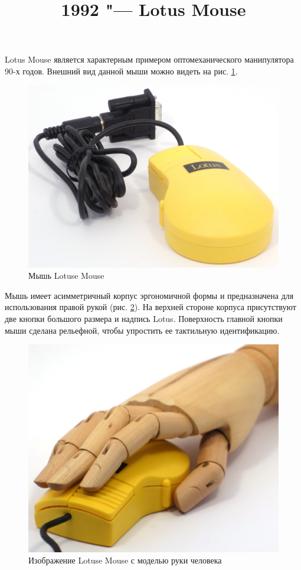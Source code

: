 \documentclass[11pt, a4paper]{article}
\begin{document}
\title{1992 "--- Lotus Mouse}
\date{}
\maketitle

Lotus Mouse является характерным примером оптомеханического манипулятора 90-х годов. Внешний вид данной мыши можно видеть на рис. \ref{fig:LotusPic}.

\begin{figure}[h]
    \centering
    \includegraphics[scale=0.6]{1992_lotus_mouse/pic_30.jpg}
    \caption{Мышь Lotuse Mouse}
    \label{fig:LotusPic}
\end{figure}

Мышь имеет асимметричный корпус эргономичной формы и предназначена для использования правой рукой (рис. \ref{fig:LotusHand}). На верхней стороне корпуса присутствуют две кнопки большого размера и надпись Lotus. Поверхность главной кнопки мыши сделана рельефной, чтобы упростить ее тактильную идентификацию.

\begin{figure}[h]
    \centering
    \includegraphics[scale=0.3]{1992_lotus_mouse/hand_30.jpg}
    \caption{Изображение Lotuse Mouse с моделью руки человека}
    \label{fig:LotusHand}
\end{figure}
\end{document}
